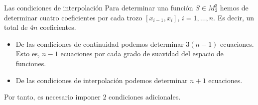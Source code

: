 \begin{frame}{Las condiciones de interpolación}
    Para determinar una función $S \in M_2^3$ hemos de determinar cuatro
    coeficientes por cada trozo $[x_{i-1}, x_i]$, $i = 1, \dots, n$. Es
    decir, un total de $4n$ coeficientes.

    \pause

    \begin{itemize}[<+->]
        \item De las condiciones de continuidad podemos determinar $3(n-1)$
        ecuaciones. Esto es, $n - 1$ ecuaciones por cada grado de suavidad
        del espacio de funciones.
        \item De las condiciones de interpolación podemos determinar $n + 1
        $ ecuaciones.
    \end{itemize}

    \pause

    Por tanto, es necesario imponer \alert{$2$ condiciones adicionales}.
\end{frame}
